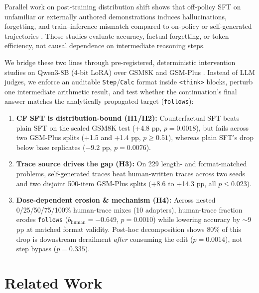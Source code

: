 \documentclass[11pt]{article}
\begin{document}
Parallel work on post-training distribution shift shows that off-policy SFT on unfamiliar or externally authored demonstrations induces hallucinations, forgetting, and train--inference mismatch compared to on-policy or self-generated trajectories \citep{gekhman2024does,shenfeld2026sdft,zhang2026onpolicysft,zhao2026onpolicyefficient}.
Those studies evaluate accuracy, factual forgetting, or token efficiency, not causal dependence on intermediate reasoning steps.

We bridge these two lines through pre-registered, deterministic intervention studies on Qwen3-8B (4-bit LoRA) over GSM8K \citep{cobbe2021training} and GSM-Plus \citep{li2024gsmplus}.
Instead of LLM judges, we enforce an auditable \texttt{Step}/\texttt{Calc} format inside \texttt{<think>} blocks, perturb one intermediate arithmetic result, and test whether the continuation's final answer matches the analytically propagated target (\texttt{follows}):
\begin{enumerate}
    \setlength{\itemsep}{1pt}
    \item \textbf{CF SFT is distribution-bound (H1/H2):} Counterfactual SFT beats plain SFT on the sealed GSM8K test (+4.8 pp, $p=0.0018$), but fails across two GSM-Plus splits (+1.5 and +1.4 pp, $p \ge 0.51$), whereas plain SFT's drop below base replicates ($-9.2$ pp, $p=0.0076$).
    \item \textbf{Trace source drives the gap (H3):} On 229 length- and format-matched problems, self-generated traces beat human-written traces across two seeds and two disjoint 500-item GSM-Plus splits (+8.6 to +14.3 pp, all $p \le 0.023$).
    \item \textbf{Dose-dependent erosion \& mechanism (H4):} Across nested 0/25/50/75/100\% human-trace mixes (10 adapters), human-trace fraction erodes \texttt{follows} ($b_{\text{human}} = -0.649$, $p = 0.0010$) while lowering accuracy by $\sim$9 pp at matched format validity. Post-hoc decomposition shows 80\% of this drop is downstream derailment \emph{after} consuming the edit ($p=0.0014$), not step bypass ($p=0.335$).
\end{enumerate}

\section{Related Work}
\label{sec:related}
\end{document}
